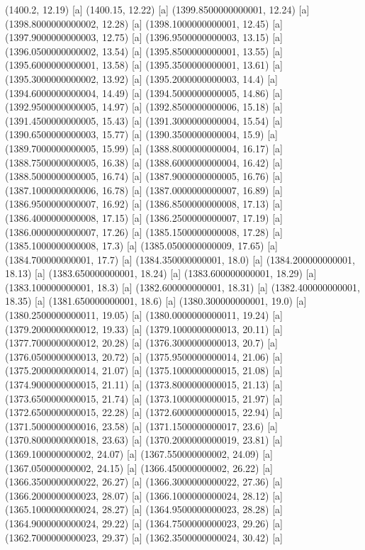 {{{(1400.2, 12.19) [a] 
(1400.15, 12.22) [a] 
(1399.8500000000001, 12.24) [a] 
(1398.8000000000002, 12.28) [a] 
(1398.1000000000001, 12.45) [a] 
(1397.9000000000003, 12.75) [a] 
(1396.9500000000003, 13.15) [a] 
(1396.0500000000002, 13.54) [a] 
(1395.8500000000001, 13.55) [a] 
(1395.6000000000001, 13.58) [a] 
(1395.3500000000001, 13.61) [a] 
(1395.3000000000002, 13.92) [a] 
(1395.2000000000003, 14.4) [a] 
(1394.6000000000004, 14.49) [a] 
(1394.5000000000005, 14.86) [a] 
(1392.9500000000005, 14.97) [a] 
(1392.8500000000006, 15.18) [a] 
(1391.4500000000005, 15.43) [a] 
(1391.3000000000004, 15.54) [a] 
(1390.6500000000003, 15.77) [a] 
(1390.3500000000004, 15.9) [a] 
(1389.7000000000005, 15.99) [a] 
(1388.8000000000004, 16.17) [a] 
(1388.7500000000005, 16.38) [a] 
(1388.6000000000004, 16.42) [a] 
(1388.5000000000005, 16.74) [a] 
(1387.9000000000005, 16.76) [a] 
(1387.1000000000006, 16.78) [a] 
(1387.0000000000007, 16.89) [a] 
(1386.9500000000007, 16.92) [a] 
(1386.8500000000008, 17.13) [a] 
(1386.4000000000008, 17.15) [a] 
(1386.2500000000007, 17.19) [a] 
(1386.0000000000007, 17.26) [a] 
(1385.1500000000008, 17.28) [a] 
(1385.1000000000008, 17.3) [a] 
(1385.0500000000009, 17.65) [a] 
(1384.700000000001, 17.7) [a] 
(1384.350000000001, 18.0) [a] 
(1384.200000000001, 18.13) [a] 
(1383.650000000001, 18.24) [a] 
(1383.600000000001, 18.29) [a] 
(1383.100000000001, 18.3) [a] 
(1382.600000000001, 18.31) [a] 
(1382.400000000001, 18.35) [a] 
(1381.650000000001, 18.6) [a] 
(1380.300000000001, 19.0) [a] 
(1380.2500000000011, 19.05) [a] 
(1380.0000000000011, 19.24) [a] 
(1379.2000000000012, 19.33) [a] 
(1379.1000000000013, 20.11) [a] 
(1377.7000000000012, 20.28) [a] 
(1376.3000000000013, 20.7) [a] 
(1376.0500000000013, 20.72) [a] 
(1375.9500000000014, 21.06) [a] 
(1375.2000000000014, 21.07) [a] 
(1375.1000000000015, 21.08) [a] 
(1374.9000000000015, 21.11) [a] 
(1373.8000000000015, 21.13) [a] 
(1373.6500000000015, 21.74) [a] 
(1373.1000000000015, 21.97) [a] 
(1372.6500000000015, 22.28) [a] 
(1372.6000000000015, 22.94) [a] 
(1371.5000000000016, 23.58) [a] 
(1371.1500000000017, 23.6) [a] 
(1370.8000000000018, 23.63) [a] 
(1370.2000000000019, 23.81) [a] 
(1369.100000000002, 24.07) [a] 
(1367.550000000002, 24.09) [a] 
(1367.050000000002, 24.15) [a] 
(1366.450000000002, 26.22) [a] 
(1366.3500000000022, 26.27) [a] 
(1366.3000000000022, 27.36) [a] 
(1366.2000000000023, 28.07) [a] 
(1366.1000000000024, 28.12) [a] 
(1365.1000000000024, 28.27) [a] 
(1364.9500000000023, 28.28) [a] 
(1364.9000000000024, 29.22) [a] 
(1364.7500000000023, 29.26) [a] 
(1362.7000000000023, 29.37) [a] 
(1362.3500000000024, 30.42) [a] 
}}}
